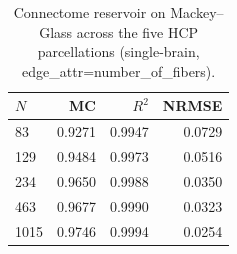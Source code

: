 \begin{table}[h]
    \centering
    \caption{Connectome reservoir on Mackey--Glass across the five HCP parcellations (single-brain, edge\_attr=number\_of\_fibers).}
    \label{tab:mg_n_sweep}
    \begin{tabular}{lrrr}
        \hline
        $N$ & MC & $R^2$ & NRMSE \\
        \hline
        83 & 0.9271 & 0.9947 & 0.0729 \\
        129 & 0.9484 & 0.9973 & 0.0516 \\
        234 & 0.9650 & 0.9988 & 0.0350 \\
        463 & 0.9677 & 0.9990 & 0.0323 \\
        1015 & 0.9746 & 0.9994 & 0.0254 \\
        \hline
    \end{tabular}
\end{table}
